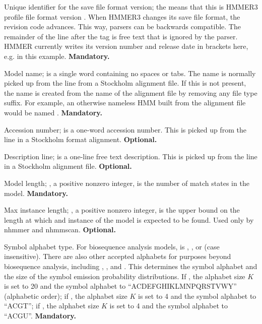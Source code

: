 \begin{sreitems}{}

\item [\monob{HMMER3/\HMMERfmtversion{}}] Unique identifier for the save file format
  version; the \mono{/\HMMERfmtversion{}} means that this is HMMER3 profile file format
  version \HMMERfmtversion{}. When HMMER3 changes its save file format, the revision
  code advances. This way, parsers can be backwards
  compatible. The remainder of the line after the  tag
  is free text that is ignored by the parser. HMMER currently writes
  its version number and release date in brackets here,
  e.g. \mono{\HMMERsavestamp{}} in this
  example. \textbf{Mandatory.}

\item [\monob{NAME <s>}] Model name;  is a single word
containing no spaces or tabs. The name is normally picked up from the
 line from a Stockholm alignment file.  If this is not
present, the name is created from the name of the alignment file by
removing any file type suffix. For example, an otherwise nameless HMM
built from the alignment file  would be named
.  \textbf{Mandatory.}

\item [\monob{ACC <s>}] Accession number;  is a one-word
accession number. This is picked up from the  line in a
Stockholm format alignment. \textbf{Optional.}

\item [\monob{DESC <s>}] Description line;  is a one-line
free text description. This is picked up from the  line
in a Stockholm alignment file. \textbf{Optional.}

\item [\monob{LENG <d>}] Model length; , a positive nonzero
integer, is the number of match states in the model.
\textbf{Mandatory.}

\item [\monob{MAXL <d>}] Max instance length; , a positive
nonzero integer, is the upper bound on the length at which and instance
of the model is expected to be found. Used only by nhmmer and nhmmscan.
\textbf{Optional.}

\item [\monob{ALPH <s>}] Symbol alphabet type. For biosequence
analysis models,  is , , or 
(case insensitive). There are also other accepted alphabets for
purposes beyond biosequence analysis, including ,
, and . This determines the symbol alphabet
and the size of the symbol emission probability distributions.  If
, the alphabet size $K$ is set to 20 and the symbol
alphabet to ``ACDEFGHIKLMNPQRSTVWY'' (alphabetic order); if
, the alphabet size $K$ is set to 4 and the symbol alphabet
to ``ACGT''; if , the alphabet size $K$ is set to 4 and the
symbol alphabet to ``ACGU''. \textbf{Mandatory.}


\end{sreitems}
